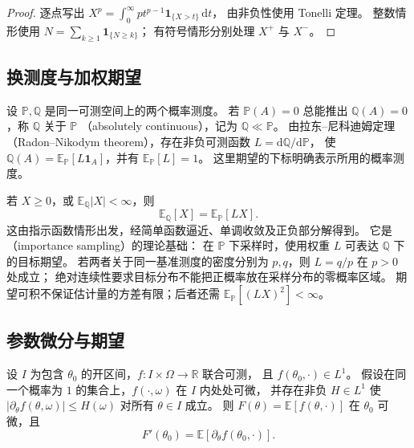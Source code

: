 \documentclass[UTF8]{ctexart}
\begin{document}
\begin{proof}
逐点写出
$X^p=\int_0^\infty p t^{p-1}\mathbf1_{\{X>t\}}\,\mathrm dt$，
由非负性使用 Tonelli 定理。
整数情形使用 $N=\sum_{k\geq1}\mathbf1_{\{N\geq k\}}$；
有符号情形分别处理 $X^+$ 与 $X^-$。
\end{proof}

\subsection{换测度与加权期望}

设 $\mathbb P,\mathbb Q$ 是同一可测空间上的两个概率测度。
若 $\mathbb P(A)=0$ 总能推出 $\mathbb Q(A)=0$，称 $\mathbb Q$ 关于 $\mathbb P$
（absolutely continuous），记为 $\mathbb Q\ll\mathbb P$。
由拉东--尼科迪姆定理（Radon--Nikodym theorem），存在非负可测函数
$L=\mathrm d\mathbb Q/\mathrm d\mathbb P$，
使 $\mathbb Q(A)=\mathbb E_{\mathbb P}[L\mathbf1_A]$，并有 $\mathbb E_{\mathbb P}[L]=1$。
这里期望的下标明确表示所用的概率测度。

若 $X\geq0$，或 $\mathbb E_{\mathbb Q}|X|<\infty$，则
\begin{equation}
  \mathbb E_{\mathbb Q}[X]
  =\mathbb E_{\mathbb P}[LX].
  \label{eq:expectation-change-measure}
\end{equation}
这由指示函数情形出发，经简单函数逼近、单调收敛及正负部分解得到。
它是（importance sampling）的理论基础：
在 $\mathbb P$ 下采样时，使用权重 $L$ 可表达 $\mathbb Q$ 下的目标期望。
若两者关于同一基准测度的密度分别为 $p,q$，则 $L=q/p$ 在 $p>0$ 处成立；
绝对连续性要求目标分布不能把正概率放在采样分布的零概率区域。
期望可积不保证估计量的方差有限；后者还需 $\mathbb E_{\mathbb P}[(LX)^2]<\infty$。

\subsection{参数微分与期望}

\begin{proposition}[期望下微分的一个充分条件]
\label{prop:expectation-differentiation}
设 $I$ 为包含 $\theta_0$ 的开区间，$f:I\times\Omega\to\mathbb R$ 联合可测，
且 $f(\theta_0,\cdot)\in L^1$。
假设在同一个概率为 $1$ 的集合上，$f(\cdot,\omega)$ 在 $I$ 内处处可微，
并存在非负 $H\in L^1$ 使
$|\partial_\theta f(\theta,\omega)|\leq H(\omega)$ 对所有 $\theta\in I$ 成立。
则 $F(\theta)=\mathbb E[f(\theta,\cdot)]$ 在 $\theta_0$ 可微，且
\[
  F'(\theta_0)
  =\mathbb E[\partial_\theta f(\theta_0,\cdot)].
\]
\end{proposition}
\end{document}
